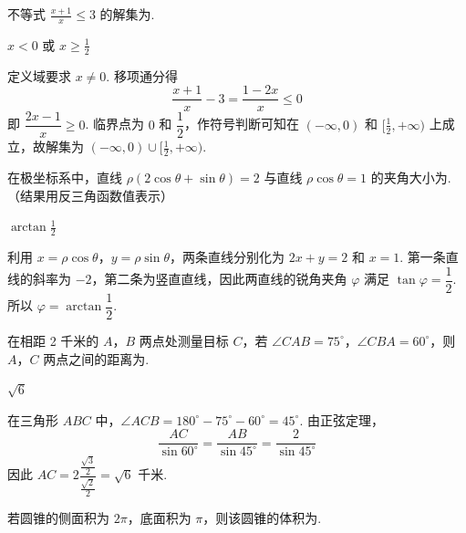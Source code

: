 \begin{problem}
不等式 \(\frac{x + 1}{x} \leqslant 3\) 的解集为\fillinblank{}.
\end{problem}

\begin{answer}
\(x<0\) 或 \(x\geqslant\frac{1}{2}\)
\end{answer}

\begin{solution}
定义域要求 \(x\ne0\). 移项通分得
\[
\frac{x+1}{x}-3=\frac{1-2x}{x}\leqslant0
\]
即 \(\dfrac{2x-1}{x}\geqslant0\). 临界点为 \(0\) 和 \(\dfrac12\)，作符号判断可知在 \((-\infty,0)\) 和 \([\frac12,+\infty)\) 上成立，故解集为 \((-\infty,0)\cup[\frac12,+\infty)\).
\end{solution}

\begin{problem}
在极坐标系中，直线 \(\rho(2\cos \theta + \sin \theta) = 2\) 与直线 \(\rho\cos \theta = 1\) 的夹角大小为\fillinblank{}. （结果用反三角函数值表示）
\end{problem}

\begin{answer}
\(\arctan\frac{1}{2}\)
\end{answer}

\begin{solution}
利用 \(x=\rho\cos\theta\)，\(y=\rho\sin\theta\)，两条直线分别化为 \(2x+y=2\) 和 \(x=1\). 第一条直线的斜率为 \(-2\)，第二条为竖直直线，因此两直线的锐角夹角 \(\varphi\) 满足 \(\tan\varphi=\dfrac{1}{2}\). 所以 \(\varphi=\arctan\dfrac{1}{2}\).
\end{solution}

\begin{problem}
在相距 2 千米的 \(A\)，\(B\) 两点处测量目标 \(C\)，若 \(\angle CAB = 75^{\circ}\)，\(\angle CBA = 60^{\circ}\)，则 \(A\)，\(C\) 两点之间的距离为\fillinblank{}.
\end{problem}

\begin{answer}
\(\sqrt{6}\)
\end{answer}

\begin{solution}
在三角形 \(ABC\) 中，\(\angle ACB=180^{\circ}-75^{\circ}-60^{\circ}=45^{\circ}\). 由正弦定理，
\[
\frac{AC}{\sin60^{\circ}}=\frac{AB}{\sin45^{\circ}}=\frac{2}{\sin45^{\circ}}
\]
因此 \(AC=2\dfrac{\frac{\sqrt3}{2}}{\frac{\sqrt2}{2}}=\sqrt6\) 千米.
\end{solution}

\begin{problem}
若圆锥的侧面积为 \(2\pi\)，底面积为 \(\pi\)，则该圆锥的体积为\fillinblank{}.
\end{problem}

